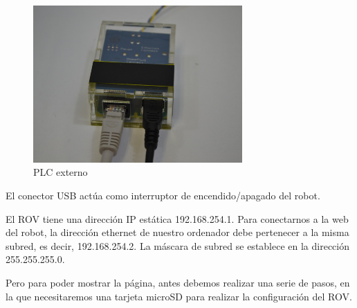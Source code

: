 \begin{figure} [hbtp]
\begin{center}
  \includegraphics[width=8cm]{img/cap3/3_4/plc_externo}
\end{center}
\caption{PLC externo}
\label{fig:plc_ext}
\end{figure}

\newpage
El conector USB actúa como interruptor de encendido/apagado del robot.

El ROV tiene una dirección IP estática 192.168.254.1. Para conectarnos a la web del robot, la dirección ethernet de nuestro ordenador debe pertenecer a la misma subred, es decir, 192.168.254.2. La máscara de subred se establece en la dirección 255.255.255.0.

Pero para poder mostrar la página, antes debemos realizar una serie de pasos, en la que necesitaremos una tarjeta microSD para realizar la configuración del ROV.
  
